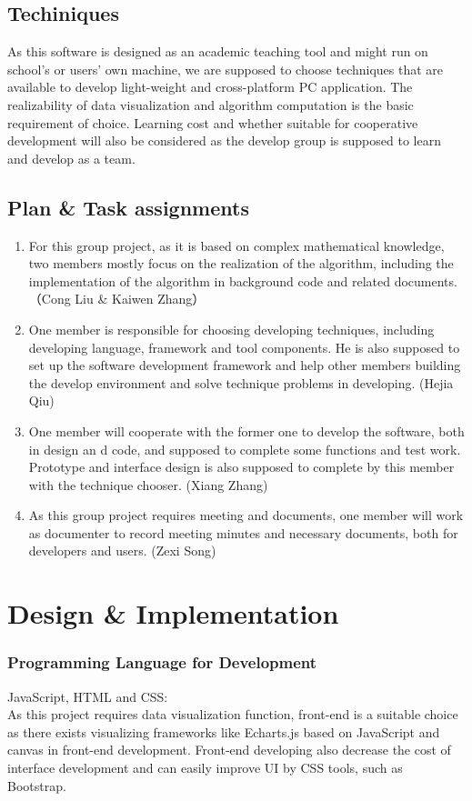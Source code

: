 \documentclass[11pt,oneside,a4paper]{article}
\begin{document}
\subsection{Techiniques}
As this software is designed as an academic teaching tool and might run on school’s or users’ own machine, we are supposed to choose techniques that are available to develop light-weight and cross-platform PC application.
The realizability of data visualization and algorithm computation is the basic requirement of choice.
Learning cost and whether suitable for cooperative development will also be considered as the develop group is supposed to learn and develop as a team.

\subsection{Plan \& Task assignments}
\begin{enumerate}
  \item For this group project, as it is based on complex mathematical knowledge, two members mostly focus on the realization of the algorithm, including the implementation of the algorithm in background code and related documents. （Cong Liu & Kaiwen Zhang）
  \item One member is responsible for choosing developing techniques, including developing language, framework and tool components. He is also supposed to set up the software development framework and help other members building the develop environment and solve technique problems in developing. (Hejia Qiu)
  \item One member will cooperate with the former one to develop the software, both in design an d code, and supposed to complete some functions and test work. Prototype and interface design is also supposed to complete by this member with the technique chooser. (Xiang Zhang)
  \item As this group project requires meeting and documents, one member will work as documenter to record meeting minutes and necessary documents, both for developers and users. (Zexi Song)
\end{enumerate}

\section{Design & Implementation}
\subsubsection{Programming Language for Development}
JavaScript, HTML and CSS:\\
As this project requires data visualization function, front-end is a suitable choice as there exists visualizing frameworks like Echarts.js based on JavaScript and canvas in front-end development.
Front-end developing also decrease the cost of interface development and can easily improve UI by CSS tools, such as Bootstrap.
\end{document}
